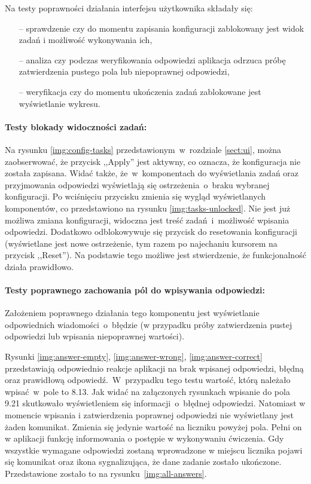 Na testy poprawności działania interfejsu użytkownika składały się:
\begin{itemize}
  \item [--] sprawdzenie czy do momentu zapisania konfiguracji zablokowany jest widok zadań i
        możliwość wykonywania ich,
  \item [--] analiza czy podczas weryfikowania odpowiedzi aplikacja odrzuca próbę zatwierdzenia
        pustego pola lub niepoprawnej odpowiedzi,
  \item [--] weryfikacja czy do momentu ukończenia zadań zablokowane jest wyświetlanie wykresu.
\end{itemize}

\paragraph{Testy blokady widoczności zadań:} Na rysunku \ref{img:config-tasks}
przedstawionym~w~rozdziale \ref{sect:ui}, można zaobserwować, że przycisk ,,Apply'' jest aktywny, co
oznacza, że konfiguracja nie została zapisana. Widać także, że~w~komponentach do wyświetlania zadań
oraz przyjmowania odpowiedzi wyświetlają się ostrzeżenia~o~braku wybranej konfiguracji. Po
wciśnięciu przycisku zmienia się wygląd wyświetlanych komponentów, co przedstawiono na rysunku
\ref{img:tasks-unlocked}. Nie jest już możliwa zmiana konfiguracji, widoczna jest treść
zadań~i~możliwość wpisania odpowiedzi. Dodatkowo odblokowywuje się przycisk do resetowania
konfiguracji (wyświetlane jest nowe ostrzeżenie, tym razem po najechaniu kursorem na przycisk
,,Reset''). Na podstawie tego możliwe jest stwierdzenie, że funkcjonalność działa prawidłowo.


\paragraph{Testy poprawnego zachowania pól do wpisywania odpowiedzi:} Założeniem poprawnego
działania tego komponentu jest wyświetlanie odpowiednich wiadomości~o~błędzie (w przypadku próby
zatwierdzenia pustej odpowiedzi lub wpisania niepoprawnej wartości).

Rysunki \ref{img:answer-empty}, \ref{img:answer-wrong}, \ref{img:answer-correct} przedstawiają
odpowiednio reakcje aplikacji na brak wpisanej odpowiedzi, błędną oraz prawidłową
odpowiedź.~W~przypadku tego testu wartość, którą należało wpisać~w~pole to 8.13. Jak widać na
załączonych rysunkach wpisanie do pola 9.21 skutkowało wyświetleniem się informacji~o~błędnej
odpowiedzi. Natomiast w momencie wpisania i zatwierdzenia poprawnej odpowiedzi nie wyświetlany jest
żaden komunikat. Zmienia się jedynie wartość na liczniku powyżej pola. Pełni on w aplikacji funkcję
informowania o postępie w wykonywaniu ćwiczenia. Gdy wszystkie wymagane odpowiedzi zostaną
wprowadzone w miejscu licznika pojawi się komunikat oraz ikona sygnalizująca, że dane zadanie
zostało ukończone. Przedstawione zostało to na rysunku~\ref{img:all-answers}.

